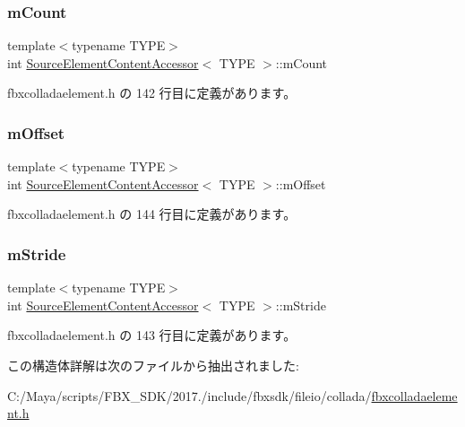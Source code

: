 \subsubsection{\texorpdfstring{m\+Count}{mCount}}
{\footnotesize\ttfamily template$<$typename T\+Y\+PE$>$ \\
int \hyperlink{struct_source_element_content_accessor}{Source\+Element\+Content\+Accessor}$<$ T\+Y\+PE $>$\+::m\+Count}



 fbxcolladaelement.\+h の 142 行目に定義があります。

\mbox{\label{struct_source_element_content_accessor_a1450ec3072e82c51aacd05fc21d15546}} 
\subsubsection{\texorpdfstring{m\+Offset}{mOffset}}
{\footnotesize\ttfamily template$<$typename T\+Y\+PE$>$ \\
int \hyperlink{struct_source_element_content_accessor}{Source\+Element\+Content\+Accessor}$<$ T\+Y\+PE $>$\+::m\+Offset}



 fbxcolladaelement.\+h の 144 行目に定義があります。

\mbox{\label{struct_source_element_content_accessor_af3895bda51b49a9086b11eaa7012ee2d}} 
\subsubsection{\texorpdfstring{m\+Stride}{mStride}}
{\footnotesize\ttfamily template$<$typename T\+Y\+PE$>$ \\
int \hyperlink{struct_source_element_content_accessor}{Source\+Element\+Content\+Accessor}$<$ T\+Y\+PE $>$\+::m\+Stride}



 fbxcolladaelement.\+h の 143 行目に定義があります。



この構造体詳解は次のファイルから抽出されました\+:\begin{DoxyCompactItemize}
\item 
C\+:/\+Maya/scripts/\+F\+B\+X\+\_\+\+S\+D\+K/2017./include/fbxsdk/fileio/collada/\hyperlink{fbxcolladaelement_8h}{fbxcolladaelement.\+h}\end{DoxyCompactItemize}
